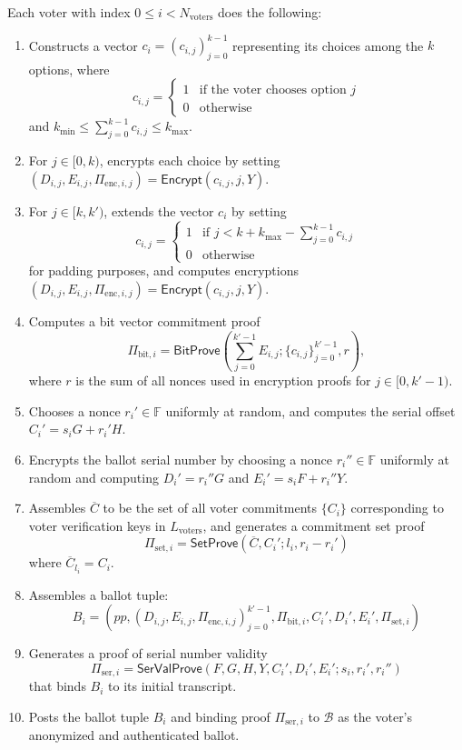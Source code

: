 \documentclass{article}
\newcommand{\F}{\mathbb{F}}
\newcommand{\func}[1]{\mathsf{#1}}
\begin{document}
Each voter with index $0 \leq i < N_{\text{voters}}$ does the following:
\begin{enumerate}
    \item Constructs a vector $c_i = (c_{i,j})_{j=0}^{k-1}$ representing its choices among the $k$ options, where
    \begin{displaymath}
        c_{i,j} = \left\{
        \begin{array}{ll}
            1 & \text{if the voter chooses option } j \\
            0 & \text{otherwise}
        \end{array}
        \right.
    \end{displaymath}
    and $k_{\text{min}} \leq \sum_{j=0}^{k-1} c_{i,j} \leq k_{\text{max}}$.
    \item For $j \in [0,k)$, encrypts each choice by setting $(D_{i,j}, E_{i,j}, \Pi_{\text{enc},i,j}) = \func{Encrypt}(c_{i,j}, j, Y)$.
    \item For $j \in [k,k')$, extends the vector $c_i$ by setting
    \begin{displaymath}
        c_{i,j} = \left\{
        \begin{array}{ll}
            1 & \text{if } j < k + k_{\text{max}} - \sum_{j=0}^{k-1} c_{i,j} \\
            0 & \text{otherwise}
        \end{array}
        \right.
    \end{displaymath}
    for padding purposes, and computes encryptions $(D_{i,j}, E_{i,j}, \Pi_{\text{enc},i,j}) = \func{Encrypt}(c_{i,j}, j, Y)$.
    \item Computes a bit vector commitment proof $$\Pi_{\text{bit},i} = \func{BitProve}\left( \sum_{j=0}^{k'-1} E_{i,j} ; \{c_{i,j}\}_{j=0}^{k'-1}, r \right),$$ where $r$ is the sum of all nonces used in encryption proofs for $j \in [0,k'-1)$.
    \item Chooses a nonce $r_i' \in \F$ uniformly at random, and computes the serial offset $C_i' = s_i G + r_i' H$.
    \item Encrypts the ballot serial number by choosing a nonce $r_i'' \in \F$ uniformly at random and computing $D_i' = r_i'' G$ and $E_i' = s_i F + r_i'' Y$.
    \item Assembles $\overline{C}$ to be the set of all voter commitments $\{C_i\}$ corresponding to voter verification keys in $L_{\text{voters}}$, and generates a commitment set proof
    $$\Pi_{\text{set},i} = \func{SetProve}\left(\overline{C}, C_i' ; l_i, r_i - r_i' \right)$$
    where $\overline{C}_{l_i} = C_i$.
    \item Assembles a ballot tuple:
    $$B_i = \left( pp, (D_{i,j}, E_{i,j}, \Pi_{\text{enc},i,j})_{j=0}^{k'-1}, \Pi_{\text{bit},i}, C_i', D_i', E_i', \Pi_{\text{set},i} \right)$$
    \item Generates a proof of serial number validity
    $$\Pi_{\text{ser},i} = \func{SerValProve}(F, G, H, Y, C_i', D_i', E_i' ; s_i, r_i', r_i'')$$
    that binds $B_i$ to its initial transcript.
    \item Posts the ballot tuple $B_i$ and binding proof $\Pi_{\text{ser},i}$ to $\mathcal{B}$ as the voter's anonymized and authenticated ballot.
\end{enumerate}
\end{document}
